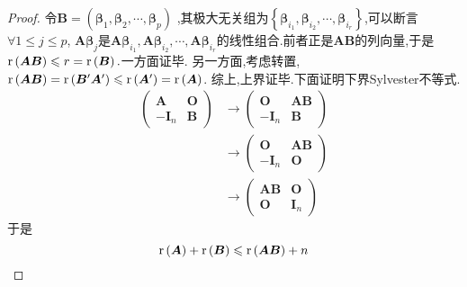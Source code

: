 {\begin{proof}
        令$\bm{B}=\left(
            \bm{\beta}_1,\bm{\beta}_2,\cdots,\bm{\beta}_p
            \right)$
        ,其极大无关组为$\left\{
            \bm{\beta}_{i_1},\bm{\beta}_{i_2},\cdots,\bm{\beta}_{i_r}
            \right\}$,可以断言$\forall 1\leqslant j\leqslant p$,
        $\bm{A\beta}_j$是$
            \bm{A\beta}_{i_1},\bm{A\beta}_{i_2},
            \cdots,\bm{A\beta}_{i_r}
        $的线性组合.前者正是$\bm{AB}$的列向量,于是
        $\mathrm{r} \left(\bm{AB}\right)\leqslant r=\mathrm{r}
            \left(\bm{B}\right).$一方面证毕.
        另一方面,考虑转置,$\mathrm{r} \left(\bm{AB}\right)=
            \mathrm{r} \left(\bm{B}^{\prime}\bm{A}^{\prime}\right)\leqslant
            \mathrm{r} \left(\bm{A}^{\prime}\right)=\mathrm{r} \left(\bm{A}
            \right)$.
        综上,上界证毕.下面证明下界Sylvester不等式.
        \begin{align*}
            \begin{pmatrix}
                \bm{A}    & \bm{O} \\
                -\bm{I}_n & \bm{B}
            \end{pmatrix}
             & \longrightarrow
            \begin{pmatrix}
                \bm{O}    & \bm{AB} \\
                -\bm{I}_n & \bm{B}
            \end{pmatrix} \\
             & \longrightarrow
            \begin{pmatrix}
                \bm{O}    & \bm{AB} \\
                -\bm{I}_n & \bm{O}
            \end{pmatrix} \\
             & \longrightarrow
            \begin{pmatrix}
                \bm{AB} & \bm{O}   \\
                \bm{O}  & \bm{I}_n
            \end{pmatrix}
        \end{align*}
        于是
        \[
            \mathrm{r} \left(\bm{A}\right)+\mathrm{r} \left(\bm{B}\right)\leqslant
            \mathrm{r} \left(\bm{AB}\right)+n\qedhere
        \]
    \end{proof}
}
